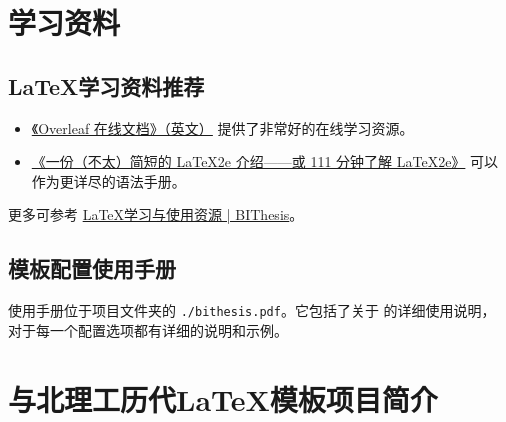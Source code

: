 \begin{appendices}
  \chapter{学习资料} \label{resources}

  \section{\LaTeX 学习资料推荐}
  \begin{itemize}[nosep]
    \item \href{https://www.overleaf.com/learn/latex/Tutorials}{《Overleaf 在线文档》（英文）} 提供了非常好的在线学习资源。
    \item \href{https://mirrors.ctan.org/info/lshort/chinese/lshort-zh-cn.pdf}{《一份（不太）简短的 LaTeX2e 介绍——或 111 分钟了解 LaTeX2e》} 可以作为更详尽的语法手册。
  \end{itemize}

  更多可参考 \href{https://bithesis.bitnp.net/guide/resources.html}{\LaTeX 学习与使用资源 | BIThesis}。

  \section{\BIThesis 模板配置使用手册}
  \BIThesis{} 使用手册位于项目文件夹的 \verb|./bithesis.pdf|。它包括了关于 \BIThesis{} 的详细使用说明，
      对于每一个配置选项都有详细的说明和示例。

  \chapter{\BIThesis 与北理工历代\LaTeX{}模板项目简介}


\end{appendices}

